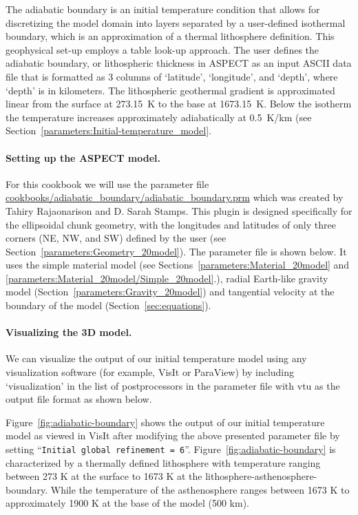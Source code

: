 \documentclass{article}
\newcommand{\aspect}{\textsc{ASPECT}}
\begin{document}
The adiabatic boundary is an initial temperature condition that allows for discretizing the model domain into layers separated by a user-defined isothermal boundary, which is an approximation of a thermal lithosphere definition. This geophysical set-up employs a table look-up approach. The user defines the adiabatic boundary, or lithospheric thickness in \aspect{} as an input ASCII data file that is formatted as 3 columns of `latitude', `longitude', and `depth', where `depth' is in kilometers. The lithospheric geothermal gradient is approximated linear from the surface at 273.15~K to the base at 1673.15~K. Below the isotherm the temperature increases approximately adiabatically at 0.5~K/km  (see Section~\ref{parameters:Initial-temperature_model}.

\paragraph{Setting up the \aspect{} model.} For this cookbook we will use the parameter file \url{cookbooks/adiabatic_boundary/adiabatic_boundary.prm}  which was created by Tahiry Rajaonarison and D. Sarah Stamps. This plugin is designed specifically for the ellipsoidal chunk geometry, with the longitudes and latitudes of only three corners (NE, NW, and SW) defined by the user (see Section~\ref{parameters:Geometry_20model}). The parameter file is shown below. It uses the simple material model (see Sections~\ref{parameters:Material_20model} and  \ref{parameters:Material_20model/Simple_20model}.), radial Earth-like gravity model (Section~\ref{parameters:Gravity_20model}) and tangential velocity at the boundary of the model (Section~\ref{sec:equations}). 

 
 
 \paragraph{Visualizing the 3D model.} We can visualize the output of our initial temperature model using any visualization software (for example, VisIt or ParaView) by including `visualization' in the list of postprocessors in the parameter file with vtu as the output file format as shown below. 
 
  
  
Figure~\ref{fig:adiabatic-boundary} shows the output of our initial temperature model as viewed in VisIt after modifying the above presented parameter file by setting ``\texttt{Initial global refinement = 6}''. Figure~\ref{fig:adiabatic-boundary} is characterized by a thermally defined lithosphere with temperature ranging between 273 K at the surface to 1673 K at the lithosphere-asthenosphere-boundary. While the temperature of the asthenosphere ranges between 1673 K to approximately 1900 K at the base of the model (500 km). 
 
\end{document}
